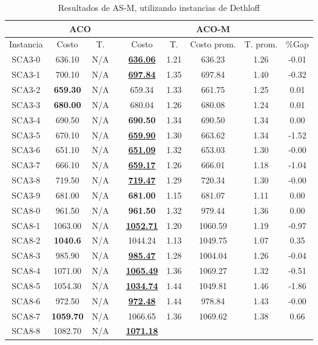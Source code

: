 \begin{table}[h]
\caption{ Resultados de AS-M, utilizando instancias de Dethloff}
\centering
\scriptsize
\begin{tabular*}{1.00\textwidth}{@{\extracolsep{\fill}} |c||c c||c c c c c c|}
\hline
 & \multicolumn{2}{c||}{\bf{ACO}} & \multicolumn{6}{c|}{\bf{ACO-M}}\\\hline
Instancia & Costo & T. & & Costo & T. & Costo prom. & T. prom. & \%Gap\\ [0.5ex]
\hline\hline
SCA3-0 & 636.10 & N/A & & \bf{\underline{636.06}} & 
1.21 & 636.23 & 1.26 & -0.01\\SCA3-1 & 700.10 & N/A & & \bf{\underline{697.84}} & 
1.35 & 697.84 & 1.40 & -0.32\\SCA3-2 & \bf{659.30} & N/A & & 
659.34 & 1.33 & 661.75 & 1.25 & 0.01\\SCA3-3 & \bf{680.00} & N/A & & 
680.04 & 1.26 & 680.08 & 1.24 & 0.01\\SCA3-4 & 690.50 & N/A & & \bf{690.50} & 
1.34 & 690.50 & 1.34 & 0.00\\SCA3-5 & 670.10 & N/A & & \bf{\underline{659.90}} & 
1.30 & 663.62 & 1.34 & -1.52\\SCA3-6 & 651.10 & N/A & & \bf{\underline{651.09}} & 
1.32 & 653.03 & 1.30 & -0.00\\SCA3-7 & 666.10 & N/A & & \bf{\underline{659.17}} & 
1.26 & 666.01 & 1.18 & -1.04\\SCA3-8 & 719.50 & N/A & & \bf{\underline{719.47}} & 
1.29 & 720.34 & 1.30 & -0.00\\SCA3-9 & 681.00 & N/A & & \bf{681.00} & 
1.15 & 681.07 & 1.11 & 0.00\\SCA8-0 & 961.50 & N/A & & \bf{961.50} & 
1.32 & 979.44 & 1.36 & 0.00\\SCA8-1 & 1063.00 & N/A & & \bf{\underline{1052.71}} & 
1.20 & 1060.59 & 1.19 & -0.97\\SCA8-2 & \bf{1040.6} & N/A & & 
1044.24 & 1.13 & 1049.75 & 1.07 & 0.35\\SCA8-3 & 985.90 & N/A & & \bf{\underline{985.47}} & 
1.28 & 1004.04 & 1.26 & -0.04\\SCA8-4 & 1071.00 & N/A & & \bf{\underline{1065.49}} & 
1.36 & 1069.27 & 1.32 & -0.51\\SCA8-5 & 1054.30 & N/A & & \bf{\underline{1034.74}} & 
1.44 & 1049.81 & 1.46 & -1.86\\SCA8-6 & 972.50 & N/A & & \bf{\underline{972.48}} & 
1.44 & 978.84 & 1.43 & -0.00\\SCA8-7 & \bf{1059.70} & N/A & & 
1066.65 & 1.36 & 1069.62 & 1.38 & 0.66\\SCA8-8 & 1082.70 & N/A & & \bf{\underline{1071.18}} & 

\end{tabular*}
\end{table}
